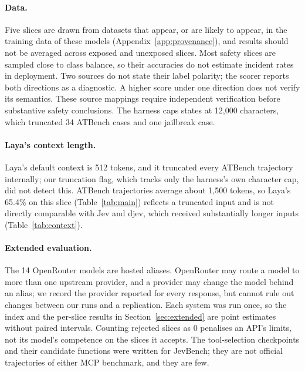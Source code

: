 \paragraph{Data.} Five slices are drawn from datasets that appear, or are likely
to appear, in the training data of these models
(Appendix~\ref{app:provenance}), and results should not be averaged across
exposed and unexposed slices. Most safety slices are sampled close to class balance, so their
accuracies do not estimate incident rates in deployment. Two sources do not
state their label polarity; the scorer reports both directions as a diagnostic.
A higher score under one direction does not verify its semantics. These source
mappings require independent verification before substantive safety conclusions.
The harness caps states
at 12{,}000 characters, which truncated 34 ATBench cases and one jailbreak case.

\paragraph{Laya's context length.} Laya's default context is 512 tokens, and it
truncated every ATBench trajectory internally; our truncation flag, which tracks
only the harness's own character cap, did not detect this. ATBench trajectories
average about 1{,}500 tokens, so Laya's 65.4\% on this slice
(Table~\ref{tab:main}) reflects a truncated input and is not directly comparable
with Jev and djev, which received substantially longer inputs
(Table~\ref{tab:context}).

\paragraph{Extended evaluation.} The 14 OpenRouter models are hosted aliases.
OpenRouter may route a model to more than one upstream provider, and a provider
may change the model behind an alias; we record the provider reported for every
response, but cannot rule out changes between our runs and a replication. Each
system was run once, so the index and the per-slice results in
Section~\ref{sec:extended} are point estimates without paired intervals.
Counting rejected slices as 0 penalises an API's limits, not its model's
competence on the slices it accepts. The tool-selection checkpoints and their
candidate functions were written for JevBench; they are not official
trajectories of either MCP benchmark, and they are few.
